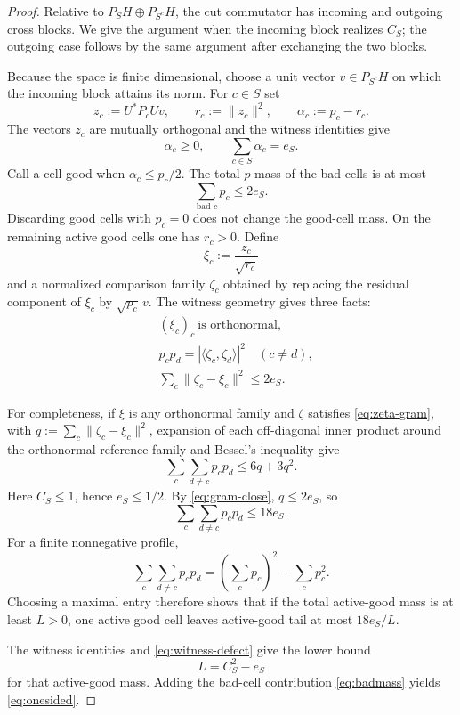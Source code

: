 \documentclass[11pt]{article}
\begin{document}
\begin{proof}
Relative to $P_SH\oplus P_{S^c}H$, the cut commutator has incoming and
outgoing cross blocks.  We give the argument when the incoming block realizes
$C_S$; the outgoing case follows by the same argument after exchanging the
two blocks.

Because the space is finite dimensional, choose a unit vector
$v\in P_{S^c}H$ on which the incoming block attains its norm.  For $c\in S$
set
\[
  z_c:=U^*P_cUv,\qquad
  r_c:=\|z_c\|^2,\qquad
  \alpha_c:=p_c-r_c.
\]
The vectors $z_c$ are mutually orthogonal and the witness identities give
\begin{equation}\label{eq:witness-defect}
  \alpha_c\ge0,\qquad
  \sum_{c\in S}\alpha_c=e_S.
\end{equation}
Call a cell good when $\alpha_c\le p_c/2$.  The total $p$-mass of the bad
cells is at most
\begin{equation}\label{eq:badmass}
  \sum_{\text{bad }c}p_c\le2e_S.
\end{equation}
Discarding good cells with $p_c=0$ does not change the good-cell mass.  On
the remaining active good cells one has $r_c>0$.  Define
\[
  \xi_c:=\frac{z_c}{\sqrt{r_c}}
\]
and a normalized comparison family $\zeta_c$ obtained by replacing the
residual component of $\xi_c$ by $\sqrt{p_c}\,v$.  The witness geometry gives
three facts:
\begin{align}
  &(\xi_c)_c\ \text{is orthonormal}, \label{eq:xi-orth}\\
  &p_cp_d=|\langle\zeta_c,\zeta_d\rangle|^2
      \quad(c\ne d), \label{eq:zeta-gram}\\
  &\sum_c\|\zeta_c-\xi_c\|^2\le2e_S. \label{eq:gram-close}
\end{align}

For completeness, if $\xi$ is any orthonormal family and $\zeta$ satisfies
\eqref{eq:zeta-gram}, with
$q:=\sum_c\|\zeta_c-\xi_c\|^2$, expansion of each off-diagonal inner product
around the orthonormal reference family and Bessel's inequality give
\begin{equation}\label{eq:gram-spread-general}
  \sum_c\sum_{d\ne c}p_cp_d
  \le 6q+3q^2.
\end{equation}
Here $C_S\le1$, hence $e_S\le1/2$.  By \eqref{eq:gram-close},
$q\le2e_S$, so
\begin{equation}\label{eq:gram18}
  \sum_c\sum_{d\ne c}p_cp_d\le18e_S.
\end{equation}
For a finite nonnegative profile,
\[
  \sum_c\sum_{d\ne c}p_cp_d
  =
  \left(\sum_cp_c\right)^2-\sum_cp_c^2.
\]
Choosing a maximal entry therefore shows that if the total active-good mass
is at least $L>0$, one active good cell leaves active-good tail at most
$18e_S/L$.

The witness identities and \eqref{eq:witness-defect} give the lower bound
\[
  L=C_S^2-e_S
\]
for that active-good mass.  Adding the bad-cell contribution
\eqref{eq:badmass} yields \eqref{eq:onesided}.
\end{proof}
\end{document}
